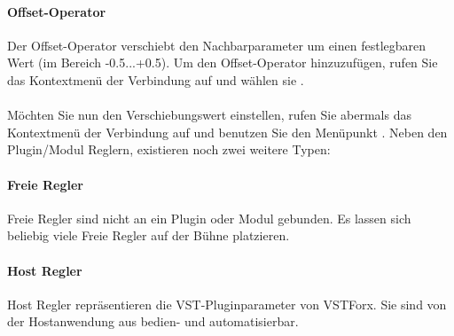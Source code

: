 \paragraph{Offset-Operator}
Der Offset-Operator verschiebt den Nachbarparameter um einen festlegbaren Wert (im Bereich -0.5...+0.5).
Um den Offset-Operator hinzuzufügen, rufen Sie das Kontextmenü der Verbindung auf und wählen sie . 
\\\\
Möchten Sie nun den Verschiebungswert einstellen, rufen Sie abermals das Kontextmenü der Verbindung auf und benutzen Sie den Menüpunkt .
Neben den Plugin/Modul Reglern, existieren noch zwei weitere Typen:

\paragraph{Freie Regler}
Freie Regler sind nicht an ein Plugin oder Modul gebunden.
Es lassen sich beliebig viele Freie Regler auf der Bühne platzieren.
\paragraph{Host Regler}
Host Regler repräsentieren die VST-Pluginparameter von VSTForx. Sie sind von der Hostanwendung aus bedien- und automatisierbar.